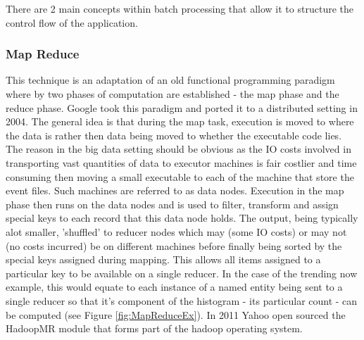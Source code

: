\documentclass[a4paper,11pt]{scrreprt}
\begin{document}
There are 2 main concepts within batch processing that allow it to structure the control flow of the application.

\subsubsection{Map Reduce}
This technique is an adaptation of an old functional programming paradigm where by two phases of computation are established - the map phase and the reduce phase. Google took this paradigm and ported it to a distributed setting in 2004\cite{mapreduce}. The general idea is that during the map task, execution is moved to where the data is rather then data being moved to whether the executable code lies. The reason in the big data setting should be obvious as the IO costs involved in transporting vast quantities of data to executor machines is fair costlier and time consuming then moving a small executable to each of the machine that store the event files. Such machines are referred to as data nodes. Execution in the map phase then runs on the data nodes and is used to filter, transform and assign special keys to each record that this data node holds. The output, being typically alot smaller, 'shuffled' to reducer nodes which may (some IO costs) or may not (no costs incurred) be on different machines before finally being sorted by the special keys assigned during mapping. This allows all items assigned to a particular key to be available on a single reducer. In the case of the trending now example, this would equate to each instance of a named entity being sent to a single reducer so that it's component of the histogram - its particular count - can be computed (see Figure \ref{fig:MapReduceEx}). In 2011 Yahoo open sourced the HadoopMR\autocite{hadoopMR} module that forms part of the hadoop operating system.\\
\end{document}
